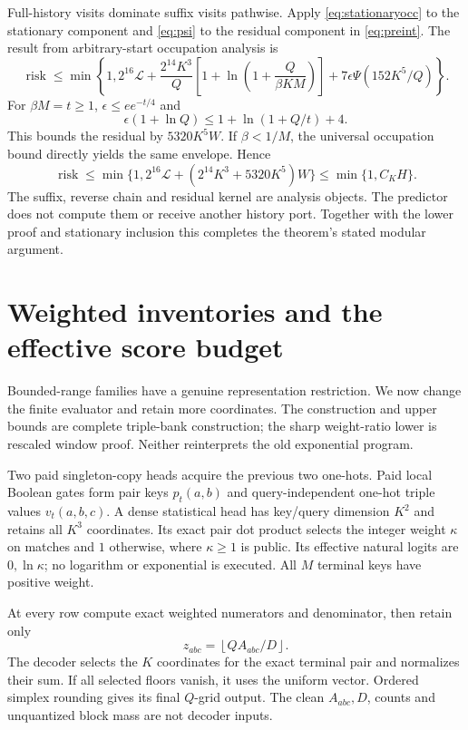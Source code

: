 \documentclass[11pt,letterpaper]{article}
\theoremstyle{definition}\newtheorem{definition}[theorem]{Definition}
\theoremstyle{remark}\newtheorem{remark}[theorem]{Remark}
\newcommand{\floor}[1]{\left\lfloor #1\right\rfloor}
\begin{document}
Full-history visits dominate suffix visits pathwise. Apply \eqref{eq:stationaryocc} to the stationary component and \eqref{eq:psi} to the residual component in \eqref{eq:preint}. The result from arbitrary-start occupation analysis is
\[
 \operatorname{risk}\le\min\left\{1,2^{16}\mathcal L+
 \frac{2^{14}K^3}{Q}\left[1+\ln\left(1+\frac Q{\beta KM}\right)\right]
 +7\epsilon\Psi(152K^5/Q)\right\}.
\]
For $\beta M=t\ge1$, $\epsilon\le e e^{-t/4}$ and
\[
 \epsilon(1+\ln Q)\le1+\ln(1+Q/t)+4.
\]
This bounds the residual by $5320K^5W$. If $\beta<1/M$, the universal occupation bound directly yields the same envelope. Hence
\[
 \operatorname{risk}\le\min\{1,2^{16}\mathcal L+(2^{14}K^3+5320K^5)W\}
 \le\min\{1,C_KH\}.
\]
The suffix, reverse chain and residual kernel are analysis objects. The predictor does not compute them or receive another history port. Together with the lower proof and stationary inclusion this completes the theorem's stated modular argument.

\section{Weighted inventories and the effective score budget}\label{sec:score}
Bounded-range families have a genuine representation restriction. We now change the finite evaluator and retain more coordinates. The construction and upper bounds are complete triple-bank construction; the sharp weight-ratio lower is rescaled window proof. Neither reinterprets the old exponential program.

Two paid singleton-copy heads acquire the previous two one-hots. Paid local Boolean gates form pair keys $p_t(a,b)$ and query-independent one-hot triple values $v_t(a,b,c)$. A dense statistical head has key/query dimension $K^2$ and retains all $K^3$ coordinates. Its exact pair dot product selects the integer weight $\kappa$ on matches and $1$ otherwise, where $\kappa\ge1$ is public. Its effective natural logits are $0,\ln\kappa$; no logarithm or exponential is executed. All $M$ terminal keys have positive weight.

At every row compute exact weighted numerators and denominator, then retain only
\[
 z_{abc}=\floor{Q A_{abc}/D}.
\]
The decoder selects the $K$ coordinates for the exact terminal pair and normalizes their sum. If all selected floors vanish, it uses the uniform vector. Ordered simplex rounding gives its final $Q$-grid output. The clean $A_{abc},D$, counts and unquantized block mass are not decoder inputs.
\end{document}
